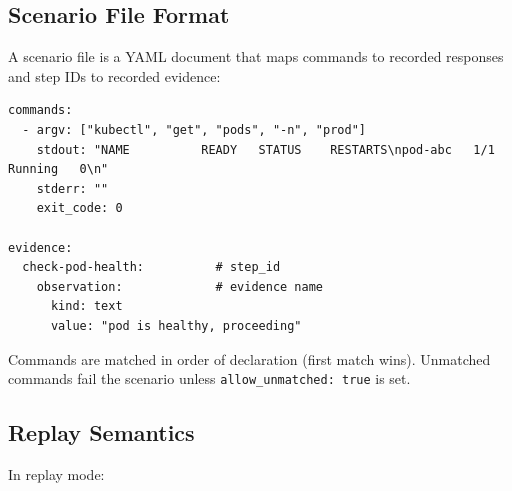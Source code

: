 \subsection{Scenario File Format}

A scenario file is a YAML document that maps commands to recorded responses and step IDs to recorded evidence:

\begin{verbatim}
commands:
  - argv: ["kubectl", "get", "pods", "-n", "prod"]
    stdout: "NAME          READY   STATUS    RESTARTS\npod-abc   1/1     Running   0\n"
    stderr: ""
    exit_code: 0

evidence:
  check-pod-health:          # step_id
    observation:             # evidence name
      kind: text
      value: "pod is healthy, proceeding"
\end{verbatim}

Commands are matched in order of declaration (first match wins). Unmatched commands fail the scenario unless \texttt{allow\_unmatched: true} is set.

\subsection{Replay Semantics}

In replay mode:

